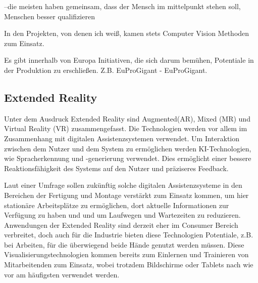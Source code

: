 \documentclass[a4paper,12pt, german]{report}
\begin{document}
--die meisten haben gemeinsam, dass der Mensch im mittelpunkt stehen soll, Menschen besser qualifizieren

In den Projekten, von denen ich weiß, kamen stets Computer Vision Methoden zum Einsatz. 

Es gibt innerhalb von Europa Initiativen, die sich darum bemühen, Potentiale in der Produktion zu erschließen. Z.B. EuProGigant - EuProGigant.


\subsection{Extended Reality}
Unter dem Ausdruck Extended Reality sind Augmented(AR), Mixed (MR) und Virtual Reality (VR) zusammengefasst. Die Technologien werden vor allem im Zusammenhang mit digitalen Assistenzsystemen verwendet. Um Interaktion zwischen dem Nutzer und dem System zu ermöglichen werden KI-Technologien, wie Spracherkennung und -generierung verwendet. Dies ermöglicht einer bessere Reaktionsfähigkeit des Systems auf den Nutzer und präziseres Feedback. 

Laut einer Umfrage sollen zukünftig solche digitalen Assistenzsysteme in den Bereichen der Fertigung und Montage verstärkt zum Einsatz kommen, um hier stationäre Arbeitsplätze zu ermöglichen, dort aktuelle Informationen zur Verfügung zu haben und und um Laufwegen und Wartezeiten zu reduzieren. Anwendungen der Extended Reality sind derzeit eher im Consumer Bereich verbreitet, doch auch für die Industrie bieten diese Technologien Potentiale, z.B. bei Arbeiten, für die überwiegend beide Hände genutzt werden müssen. Diese Visualisierungstechnologien kommen bereits zum Einlernen und Trainieren von Mitarbeitenden zum Einsatz, wobei trotzdem Bildschirme oder Tablets nach wie vor am häufigsten verwendet werden.
\end{document}
